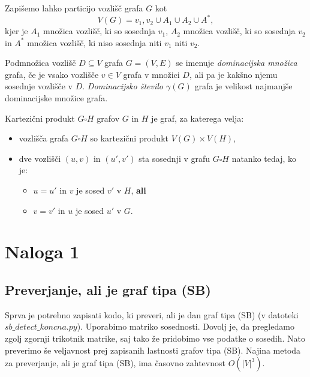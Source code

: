 \documentclass{article}
\begin{document}
Zapišemo lahko particijo vozlišč grafa $G$ kot $$V(G) = {v_1, v_2} \cup A_1 \cup A_2 \cup A^*,$$
kjer je $A_1$ množica vozlišč, ki so sosednja $v_1$, $A_2$ množica vozlišč, ki so sosednja $v_2$ in 
$A^*$ množica vozlišč, ki niso sosednja niti $v_1$ niti $v_2$.

\begin{definition}
   Podmnožica vozlišč $D\subseteq V$ grafa $G=(V,E)$ se imenuje \emph{dominacijska množica} grafa,
   če je vsako vozlišče $v\in V$ grafa v množici $D$, ali pa je kakšno njemu sosednje vozlišče
   v $D$. \emph{Dominacijsko število $\gamma(G)$} grafa je velikost najmanjše dominacijske
   množice grafa.
\end{definition}

\begin{definition}
    Kartezični produkt $G\square H$ grafov $G$ in $H$ je graf, za katerega velja:
    \begin{itemize}
        \item vozlišča grafa $G\square H$ so kartezični produkt $V(G)\times V(H)$,
        \item dve vozlišči $(u,v)$ in $(u',v')$ sta sosednji v grafu $G\square H$ natanko tedaj, ko je:
        \begin{itemize}
            \item $u=u'$ in $v$ je sosed $v'$ v $H$, \textbf{ali}
            \item $v=v'$ in $u$ je sosed $u'$ v $G$.
        \end{itemize}
    \end{itemize}
\end{definition}

\section{Naloga 1}
\subsection{Preverjanje, ali je graf tipa (SB)}
Sprva je potrebno zapisati kodo, ki preveri, ali je dan graf tipa (SB) (v datoteki $sb\_detect\_koncna.py$). Uporabimo matriko sosednosti. Dovolj je, 
da pregledamo zgolj zgornji trikotnik matrike, saj tako že pridobimo vse podatke o sosedih. Nato 
preverimo še veljavnost prej zapisanih lastnosti grafov tipa (SB). Najina metoda za preverjanje, ali je graf tipa (SB), ima časovno zahtevnost $O(|V|^3)$.
\end{document}
